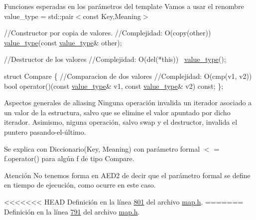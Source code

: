 \begin{DoxyParagraph}{Funciones esperadas en los parámetros del template}
Vamos a usar el renombre value\+\_\+type = std\+::pair$<$const Key,\+Meaning$>$


\begin{DoxyCode}
\textcolor{comment}{//Constructor por copia de valores.}
\textcolor{comment}{//Complejidad: O(copy(other))}
\hyperlink{classaed2_1_1map_a719db98e0ff9a837610f76be33264680_a719db98e0ff9a837610f76be33264680}{value\_type}(\textcolor{keyword}{const} \hyperlink{classaed2_1_1map_a719db98e0ff9a837610f76be33264680_a719db98e0ff9a837610f76be33264680}{value\_type}& other);

\textcolor{comment}{//Destructor de los valores}
\textcolor{comment}{//Complejidad: O(del(*this))}
~\hyperlink{classaed2_1_1map_a719db98e0ff9a837610f76be33264680_a719db98e0ff9a837610f76be33264680}{value\_type}();

\textcolor{keyword}{struct }Compare \{
  \textcolor{comment}{//Comparacion de dos valores}
  \textcolor{comment}{//Complejidad: O(cmp(v1, v2))}
  \textcolor{keywordtype}{bool} operator()(\textcolor{keyword}{const} \hyperlink{classaed2_1_1map_a719db98e0ff9a837610f76be33264680_a719db98e0ff9a837610f76be33264680}{value\_type}& v1, \textcolor{keyword}{const} \hyperlink{classaed2_1_1map_a719db98e0ff9a837610f76be33264680_a719db98e0ff9a837610f76be33264680}{value\_type}& v2) \textcolor{keyword}{const};
\};
\end{DoxyCode}
 
\end{DoxyParagraph}


\begin{DoxyParagraph}{Aspectos generales de aliasing}
Ninguna operación invalida un iterador asociado a un valor de la estructura, salvo que se elimine el valor apuntado por dicho iterador. Asimismo, niguna operación, salvo swap y el destructor, invalida el puntero pasando-\/el-\/último.
\end{DoxyParagraph}
\begin{DoxyParagraph}{Se explica con}
Diccionario(Key, Meaning) con parámetro formal $<$ = f.\+operator() para algún f de tipo Compare.
\end{DoxyParagraph}
\begin{DoxyAttention}{Atención}
No tenemos forma en A\+E\+D2 de decir que el parámetro formal se define en tiempo de ejecución, como ocurre en este caso. 
\end{DoxyAttention}


<<<<<<< HEAD
\-Definición en la línea \hyperlink{map_8h_source_l00801}{801} del archivo \hyperlink{map_8h_source}{map.\-h}.
=======
Definición en la línea \hyperlink{map_8h_source_l00791}{791} del archivo \hyperlink{map_8h_source}{map.\+h}.



